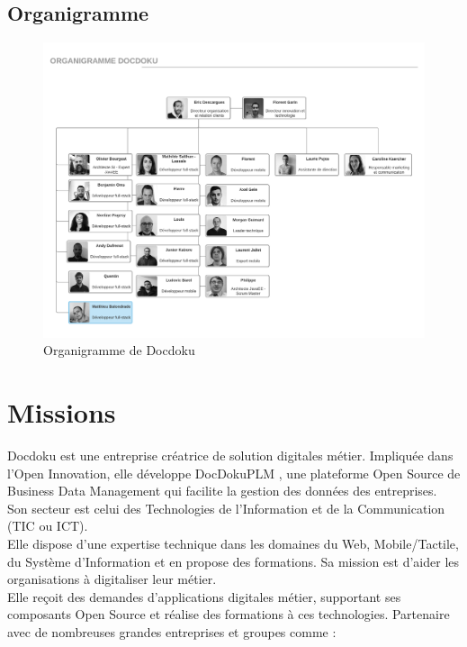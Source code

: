 \documentclass[11pt]{report}
\begin{document}
		\section{Organigramme}

			\begin{landscape}
				\begin{figure}[!htb]
				\center
				\includegraphics[scale=0.75]{Organigramme.pdf}
				\caption{Organigramme de Docdoku}
				\end{figure}
			\end{landscape}

	\chapter{Missions}

		Docdoku est une entreprise créatrice de solution digitales métier. Impliquée dans l'Open Innovation, elle développe DocDokuPLM , une plateforme Open Source de Business Data Management qui facilite la gestion des données des entreprises.\\
		Son secteur est celui des Technologies de l'Information et de la Communication (TIC ou ICT).\\
		Elle dispose d'une expertise technique dans les domaines du Web, Mobile/Tactile, du Système d'Information et en propose des formations. 
		Sa mission est d'aider les organisations à digitaliser leur métier.\\
		Elle reçoit des demandes d'applications digitales métier, supportant ses composants Open Source et réalise des formations à ces technologies.
		Partenaire avec de nombreuses grandes entreprises et groupes comme :
\end{document}
